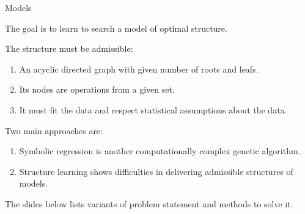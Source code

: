 \documentclass{beamer}
\begin{document}
\begin{frame}{Models}

The goal is to learn to search a model of optimal structure.

\medskip
{\color{blue}The structure must be admissible:}
    \begin{enumerate}
        \item An acyclic directed graph with given number of roots and leafs.
        \item Its nodes are operations from a given set.
        \item It must fit the data and respect statistical assumptions about the data.
    \end{enumerate}

\medskip
{\color{blue}Two main approaches are:}
    \begin{enumerate}
        \item Symbolic regression is another computationally complex genetic algorithm.
        \item Structure learning shows difficulties in delivering admissible structures of models.
    \end{enumerate}

The slides below lists variants of problem statement and methods to solve it.
\end{frame}
\end{document}
